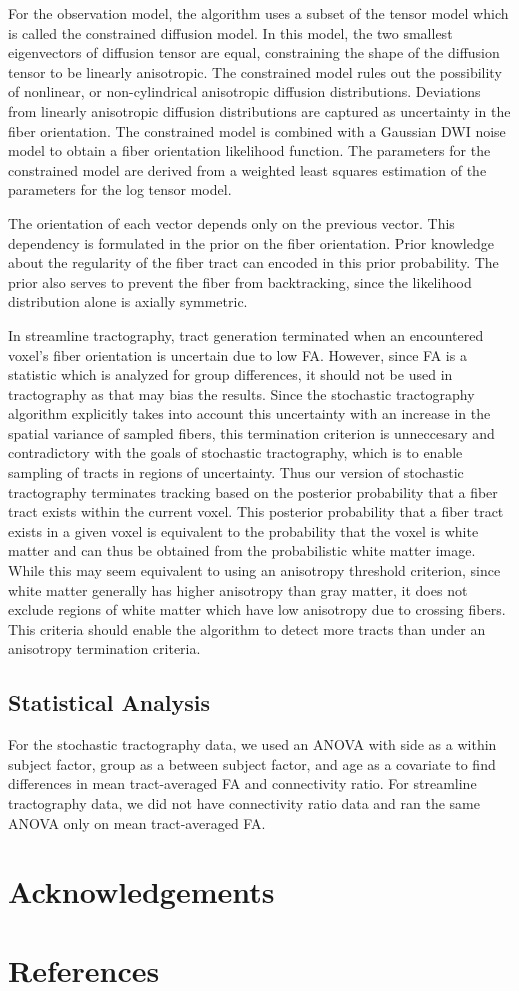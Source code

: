 \documentclass{article}
\begin{document}
For the observation model, the algorithm uses a subset of the tensor model which is called the constrained diffusion model.  In this model, the two smallest eigenvectors of diffusion tensor are equal, constraining the shape of the diffusion tensor to be linearly anisotropic.  The constrained model rules out the possibility of nonlinear, or non-cylindrical anisotropic diffusion distributions.  Deviations from linearly anisotropic diffusion distributions are captured as uncertainty in the fiber orientation.  The constrained model is combined with a Gaussian DWI noise model to obtain a fiber orientation likelihood function.  The parameters for the constrained model are derived from a weighted least squares estimation of the parameters for the log tensor model.

The orientation of each vector depends only on the previous vector.  This dependency is formulated in the prior on the fiber orientation.  Prior knowledge about the regularity of the fiber tract can encoded in this prior probability.  The prior also serves to prevent the fiber from backtracking, since the likelihood distribution alone is axially symmetric.

In streamline tractography, tract generation terminated when an encountered voxel's fiber orientation is uncertain due to low FA.  However, since FA is a statistic which is analyzed for group differences, it should not be used in tractography as that may bias the results.  Since the stochastic tractography algorithm explicitly takes into account this uncertainty with an increase in the spatial variance of sampled fibers, this termination criterion is unneccesary and contradictory with the goals of stochastic tractography, which is to enable sampling of tracts in regions of uncertainty.  Thus our version of stochastic tractography terminates tracking based on the posterior probability that a fiber tract exists within the current voxel.  This posterior probability that a fiber tract exists in a given voxel is equivalent to the probability that the voxel is white matter and can thus be obtained from the probabilistic white matter image.  While this may seem equivalent to using an anisotropy threshold criterion, since white matter generally has higher anisotropy than gray matter, it does not exclude regions of white matter which have low anisotropy due to crossing fibers.  This criteria should enable the algorithm to detect more tracts than under an anisotropy termination criteria.

\subsection{Statistical Analysis}
For the stochastic tractography data, we used an ANOVA with side as a within subject factor, group as a between subject factor, and age as a covariate to find differences in mean tract-averaged FA and connectivity ratio.  For streamline tractography data, we did not have connectivity ratio data and ran the same ANOVA only on mean tract-averaged FA.

\section{Acknowledgements}
\section{References}

\end{document}
